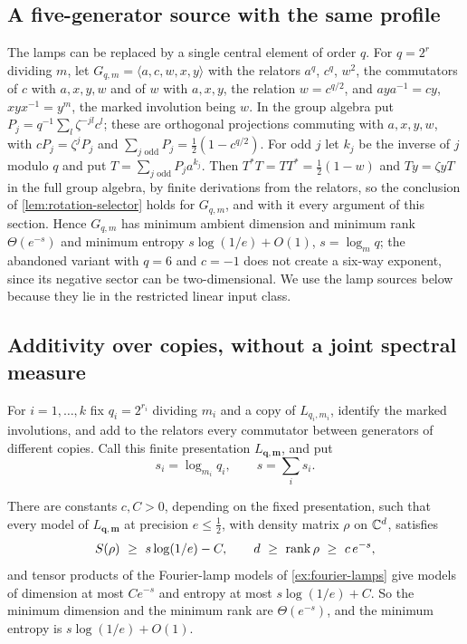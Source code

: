 \subsection{A five-generator source with the same profile}\label{sec:rates-five}

The lamps can be replaced by a single central element of order $q$. For $q=2^r$ dividing $m$, let
$G_{q,m}=\langle a,c,w,x,y\rangle$ with the relators $a^q$, $c^q$, $w^2$, the commutators of $c$ with $a,x,y,w$ and of $w$ with
$a,x,y$, the relation $w=c^{q/2}$, and $aya^{-1}=cy$, $xyx^{-1}=y^m$, the marked involution being $w$. In the group algebra
put $P_j=q^{-1}\sum_l\zeta^{-jl}c^l$; these are orthogonal projections commuting with $a,x,y,w$, with $cP_j=\zeta^jP_j$ and
$\sum_{j\text{ odd}}P_j=\frac12(1-c^{q/2})$. For odd $j$ let $k_j$ be the inverse of $j$ modulo $q$ and put
$T=\sum_{j\text{ odd}}P_ja^{k_j}$. Then $T^*T=TT^*=\frac12(1-w)$ and $Ty=\zeta yT$ in the full group algebra, by finite derivations
from the relators, so the conclusion of \cref{lem:rotation-selector} holds for $G_{q,m}$, and with it every argument of this
section. Hence $G_{q,m}$ has minimum ambient dimension and minimum rank $\Theta(e^{-s})$ and minimum entropy
$s\log(1/e)+O(1)$, $s=\log_mq$; the abandoned variant with $q=6$ and $c=-1$ does not create a six-way exponent, since its
negative sector can be two-dimensional. We use the lamp sources below because they lie in the restricted linear input
class.

\subsection{Additivity over copies, without a joint spectral measure}\label{sec:additive}

For $i=1,\dots,k$ fix $q_i=2^{r_i}$ dividing $m_i$ and a copy of $L_{q_i,m_i}$, identify the marked involutions, and add to the
relators every commutator between generators of different copies. Call this finite presentation $L_{\mathbf q,\mathbf m}$, and put
\[
s_i=\log_{m_i}q_i,\qquad s=\sum_is_i .
\]

\begin{theorem}\label{thm:additive}
There are constants $c,C>0$, depending on the fixed presentation, such that every model of $L_{\mathbf q,\mathbf m}$ at precision
$e\le\frac12$, with density matrix $\rho$ on $\mathbb C^d$, satisfies
\[
S(\rho)\ \ge\ s\log(1/e)-C,\qquad d\ \ge\ \rank\rho\ \ge\ c\,e^{-s},
\]
and tensor products of the Fourier-lamp models of \cref{ex:fourier-lamps} give models of dimension at most $Ce^{-s}$ and
entropy at most $s\log(1/e)+C$. So the minimum dimension and the minimum rank are $\Theta(e^{-s})$, and the minimum entropy is
$s\log(1/e)+O(1)$.
\end{theorem}


